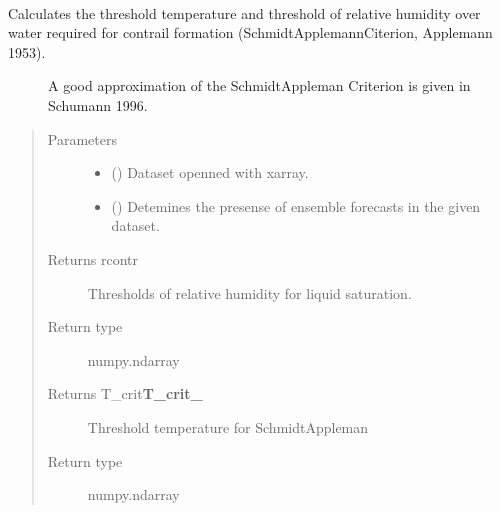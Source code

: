 \documentclass[a4paper,11pt,english]{sphinxmanual}
\begin{document}
\begin{fulllineitems}
\label{\detokenize{modules:envlib.contrail.get_cont_form_thr}}~\begin{description}
\item[{Calculates the threshold temperature and threshold of relative humidity over water required for contrail formation (Schmidt\sphinxhyphen{}Applemann\sphinxhyphen{}Citerion, Applemann 1953). }] \leavevmode
A good approximation of the Schmidt\sphinxhyphen{}Appleman Criterion is given in Schumann 1996.

\end{description}
\begin{quote}\begin{description}
\item[{Parameters}] \leavevmode\begin{itemize}
\item {} 
 () \textendash{} Dataset openned with xarray.

\item {} 
 () \textendash{} Detemines the presense of ensemble forecasts in the given dataset.

\end{itemize}

\item[{Returns rcontr}] \leavevmode
Thresholds of relative humidity for liquid saturation.

\item[{Return type}] \leavevmode
numpy.ndarray

\item[{Returns T\_crit{\color{red}\bfseries{}T\_crit\_}}] \leavevmode
Threshold temperature for Schmidt\sphinxhyphen{}Appleman

\item[{Return type}] \leavevmode
numpy.ndarray

\end{description}\end{quote}

\end{fulllineitems}

\end{document}
